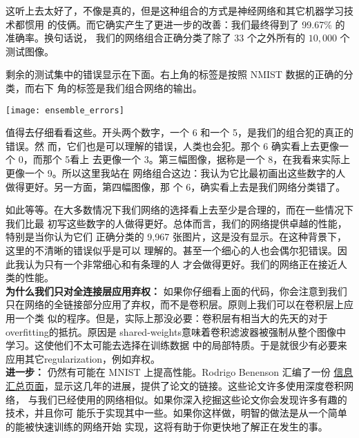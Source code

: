 这听上去太好了，不像是真的，但是这种组合的方式是神经网络和其它机器学习技术都惯用
的伎俩。而它确实产生了更进一步的改善：我们最终得到了 99.67\% 的准确率。换句话说，
我们的网络组合正确分类了除了 $33$ 个之外所有的 $10,000$ 个测试图像。

剩余的测试集中的错误显示在下面。右上角的标签是按照 NMIST 数据的正确的分类，而右下
角的标签是我们组合网络的输出。
\begin{center}
  \texttt{[image: ensemble\_errors]}
\end{center}

值得去仔细看看这些。开头两个数字，一个 6 和一个 5，是我们的组合犯的真正的错误。然
而，它们也是可以理解的错误，人类也会犯。那个 6 确实看上去更像一个 0，而那个 5看上
去更像一个 3。第三幅图像，据称是一个 8，在我看来实际上更像一个 9。所以这里我站在
网络组合这边：我认为它比最初画出这些数字的人做得更好。另一方面，第四幅图像，那
个 6，确实看上去是我们网络分类错了。

如此等等。在大多数情况下我们网络的选择看上去至少是合理的，而在一些情况下我们比最
初写这些数字的人做得更好。总体而言，我们的网络提供卓越的性能，特别是当你认为它们
正确分类的 9,967 张图片，这是没有显示。在这种背景下，这里的不清晰的错误似乎是可以
理解的。甚至一个细心的人也会偶尔犯错误。因此我认为只有一个非常细心和有条理的人
才会做得更好。我们的网络正在接近人类的性能。\\

\textbf{为什么我们只对全连接层应用弃权：} 如果你仔细看上面的代码，你会注意到我们
只在网络的全链接部分应用了弃权，而不是卷积层。原则上我们可以在卷积层上应用一个类
似的程序。但是，实际上那没必要：卷积层有相当大的先天的对于\gls*{overfitting}的抵抗。原因是
\gls*{shared-weights}意味着卷积滤波器被强制从整个图像中学习。这使他们不太可能去选择在训练数据
中的局部特质。于是就很少有必要来应用其它\gls*{regularization}，例如弃权。\\

\textbf{进一步：} 仍然有可能在 MNIST 上提高性能。Rodrigo Benenson 汇编了一份%
\href{http://rodrigob.github.io/are_we_there_yet/build/classification_datasets_results.html}{%
  信息汇总页面}，显示这几年的进展，提供了论文的链接。这些论文许多使用深度卷积网络，
与我们已经使用的网络相似。如果你深入挖掘这些论文你会发现许多有趣的技术，并且你可
能乐于实现其中一些。如果你这样做，明智的做法是从一个简单的能被快速训练的网络开始
实现，这将有助于你更快地了解正在发生的事。

